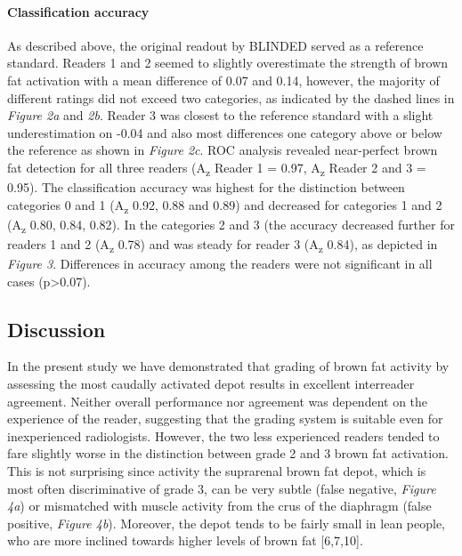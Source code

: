 \documentclass[]{elsarticle} %
\begin{document}
\paragraph{Classification accuracy}\label{classification-accuracy-1}

As described above, the original readout by BLINDED served as a
reference standard. Readers 1 and 2 seemed to slightly overestimate the
strength of brown fat activation with a mean difference of 0.07 and
0.14, however, the majority of different ratings did not exceed two
categories, as indicated by the dashed lines in \emph{Figure 2a} and
\emph{2b}. Reader 3 was closest to the reference standard with a slight
underestimation on -0.04 and also most differences one category above or
below the reference as shown in \emph{Figure 2c}. ROC analysis revealed
near-perfect brown fat detection for all three readers
(A\textsubscript{z} Reader 1 = 0.97, A\textsubscript{z} Reader 2 and 3 =
0.95). The classification accuracy was highest for the distinction
between categories 0 and 1 (A\textsubscript{z} 0.92, 0.88 and 0.89) and
decreased for categories 1 and 2 (A\textsubscript{z} 0.80, 0.84, 0.82).
In the categories 2 and 3 (the accuracy decreased further for readers 1
and 2 (A\textsubscript{z} 0.78) and was steady for reader 3
(A\textsubscript{z} 0.84), as depicted in \emph{Figure 3}. Differences
in accuracy among the readers were not significant in all cases
(p\textgreater{}0.07).

\subsection{Discussion}\label{discussion}

In the present study we have demonstrated that grading of brown fat
activity by assessing the most caudally activated depot results in
excellent interreader agreement. Neither overall performance nor
agreement was dependent on the experience of the reader, suggesting that
the grading system is suitable even for inexperienced radiologists.
However, the two less experienced readers tended to fare slightly worse
in the distinction between grade 2 and 3 brown fat activation. This is
not surprising since activity the suprarenal brown fat depot, which is
most often discriminative of grade 3, can be very subtle (false
negative, \emph{Figure 4a}) or mismatched with muscle activity from the
crus of the diaphragm (false positive, \emph{Figure 4b}). Moreover, the
depot tends to be fairly small in lean people, who are more inclined
towards higher levels of brown fat {[}6,7,10{]}.
\end{document}
